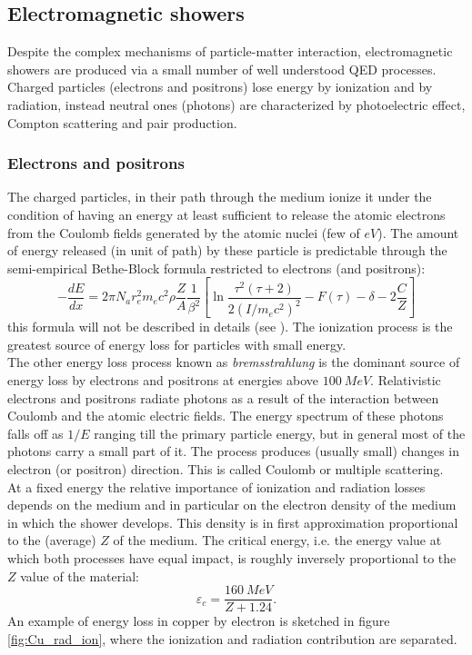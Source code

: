 \subsection{Electromagnetic showers} \label{subsec:em_shower}
Despite the complex mechanisms of particle-matter interaction, electromagnetic showers are produced via a small number of well understood QED processes. Charged particles (electrons and positrons) lose energy by ionization and by radiation, instead neutral ones (photons) are characterized by photoelectric effect, Compton scattering and pair production.

\subsubsection*{Electrons and positrons}
The charged particles, in their path through the medium ionize it under the condition of having an energy at least sufficient to release the atomic electrons from the Coulomb fields generated by the atomic nuclei (few of $eV$).
The amount of energy released (in unit of path) by these particle is predictable through the semi-empirical Bethe-Block formula restricted to electrons (and positrons):
\begin{equation}
    -\frac{dE}{dx} = 2\pi N_a r_e^2 m_e c^2 \rho \frac{Z}{A}\frac{1}{\beta^2}\left[ \ln{\frac{\tau^2(\tau + 2)}{2(I/m_ec^2)^2}} -F(\tau) -\delta -2\frac{C}{Z}\right]
\end{equation}
this formula will not be described in details (see \cite{Leo}). The ionization process is the greatest source of energy loss for particles with small energy.\\
The other energy loss process known as \textit{bremsstrahlung} is the dominant source of energy loss by electrons and positrons at energies above $100\ MeV$. Relativistic electrons and positrons radiate photons as a result of the interaction between Coulomb and the atomic electric fields. The energy spectrum of these photons falls off as $1/E$ ranging till the primary particle energy, but in general most of the photons carry a small part of it.
The process produces (usually small) changes in electron (or positron) direction. This is called Coulomb or multiple scattering.\\
At a fixed energy the relative importance of ionization and radiation losses depends on the medium and in particular on the electron density of the medium in which the shower develops. This density is in first approximation proportional to the (average) $Z$ of the medium.
The critical energy, i.e. the energy value at which both processes have equal impact, is roughly inversely proportional to the $Z$ value of the material:
\begin{equation}
    \varepsilon_c = \frac{160\ MeV}{Z + 1.24}.
\end{equation}
An example of energy loss in copper by electron is sketched in figure \ref{fig:Cu_rad_ion}, where the ionization and radiation contribution are separated.

